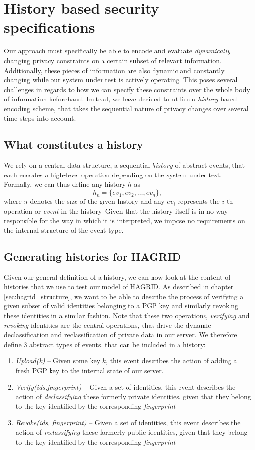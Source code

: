 \section{History based security specifications}
Our approach must specifically be able to encode and evaluate \emph{dynamically} changing privacy constraints on a certain subset of relevant information. Additionally, these pieces of information are also dynamic and constantly changing while our system under test is actively operating. This poses several challenges in regards to how we can specify these constraints over the whole body of information beforehand. 
Instead, we have decided to utilise a \emph{history} based encoding scheme, that takes the sequential nature of privacy changes over several time steps into account.
\subsection{What constitutes a history}
We rely on a central data structure, a sequential \emph{history} of abstract events, that each encodes a high-level operation depending on the system under test.
Formally, we can thus define any history \(h\) as
\[
    h_n = \{ev_1,ev_2,\dots, ev_n\},
\]
where \(n\) denotes the size of the given history and any \(ev_i\) represents the \(i\)-th operation or \emph{event} in the history.
Given that the history itself is in no way responsible for the way in which it is interpreted, we impose no requirements on the internal structure of the event type.
\subsection{Generating histories for HAGRID}
Given our general definition of a history, we can now look at the content of histories that we use to test our model of HAGRID. 
As described in chapter \ref{sec:hagrid_structure}, we want to be able to describe the process of verifying a given subset of valid identities belonging to a PGP key and similarly revoking these identities in a similar fashion. Note that these two operations, \emph{verifying} and \emph{revoking} identities are the central operations, that drive the dynamic declassification and reclassification of private data in our server.
We therefore define 3 abstract types of events, that can be included in a history: 
\begin{enumerate}
    \item \emph{Upload(k)} -- Given some key \(k\), this event describes the action of adding a fresh PGP key to the internal state of our server.
    \item \emph{Verify(ids,fingerprint)} -- Given a set of identities, this event describes the action of \emph{declassifying} these formerly private identities, given that they belong to the key identified by the corresponding \emph{fingerprint}
    \item \emph{Revoke(ids, fingerprint)} -- Given a set of identities, this event describes the action of \emph{reclassifying} these formerly public identities, given that they belong to the key identified by the corresponding \emph{fingerprint}
\end{enumerate}

